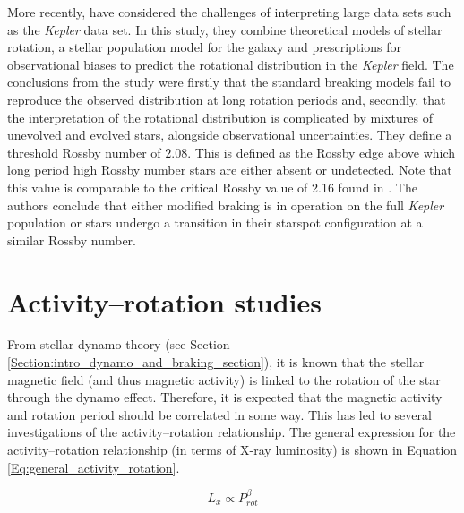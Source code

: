 More recently, \citet{van_Saders_etal_2019} have considered the challenges of interpreting large data sets such as the \textit{Kepler} data set. In this study, they combine theoretical models of stellar rotation, a stellar population model for the galaxy and prescriptions for observational biases to predict the rotational distribution in the \textit{Kepler} field. The conclusions from the study were firstly that the standard breaking models fail to reproduce the observed distribution at long rotation periods and, secondly, that the interpretation of the rotational distribution is complicated by mixtures of unevolved and evolved stars, alongside observational uncertainties. They define a threshold Rossby number of $2.08$. This is defined as the Rossby edge above which long period high Rossby number stars are either absent or undetected. Note that this value is comparable to the critical Rossby value of 2.16 found in \citet{van_Saders_etal_2016}. The authors conclude that either modified braking is in operation on the full \textit{Kepler} population or stars undergo a transition in their starspot configuration at a similar Rossby number.


\section{Activity--rotation studies}
\label{Chp2_activity-rotation_lit_review}

From stellar dynamo theory (see Section \ref{Section:intro_dynamo_and_braking_section}), it is known that the stellar magnetic field (and thus magnetic activity) is linked to the rotation of the star through the dynamo effect. Therefore, it is expected that the magnetic activity and rotation period should be correlated in some way. This has led to several investigations of the activity--rotation relationship. The general expression for the activity--rotation relationship (in terms of X-ray luminosity) is shown in Equation \ref{Eq:general_activity_rotation}.

\begin{equation}
    L_{x} \propto P_{rot}^{\beta}
    \label{Eq:general_activity_rotation}
\end{equation}

